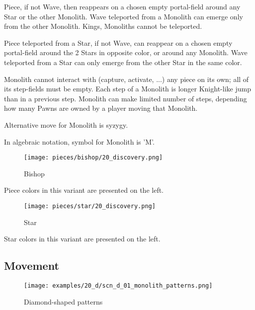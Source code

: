 Piece, if not Wave, then reappears on a chosen empty portal-field around
any Star or the other Monolith. Wave teleported from a Monolith can emerge
only from the other Monolith. Kings, Monoliths cannot be teleported.

Piece teleported from a Star, if not Wave, can reappear on a chosen empty
portal-field around the 2 Stars in opposite color, or around any Monolith.
Wave teleported from a Star can only emerge from the other Star in the same
color.

Monolith cannot interact with (capture, activate, ...) any piece on its own;
all of its step-fields must be empty. Each step of a Monolith is longer
Knight-like jump than in a previous step. Monolith can make limited number of
steps, depending how many Pawns are owned by a player moving that Monolith.

Alternative move for Monolith is syzygy.

In algebraic notation, symbol for Monolith is 'M'.

\clearpage %

\noindent
\begin{wrapfigure}[2]{l}{0.4\textwidth}
\centering
\texttt{[image: pieces/bishop/20\_discovery.png]}
\caption{Bishop}
\label{fig:bishop/20_discovery}
\end{wrapfigure}
Piece colors in this variant are presented on the left.

\vspace*{0.30\textheight}
\noindent
\begin{wrapfigure}[2]{l}{0.4\textwidth}
\centering
\texttt{[image: pieces/star/20\_discovery.png]}
\caption{Star}
\label{fig:star/20_discovery}
\end{wrapfigure}
Star colors in this variant are presented on the left.

\clearpage %

\subsection*{Movement}
\label{sec:Discovery/Monolith/Movement}

\vspace*{-1.4\baselineskip}
\noindent
\begin{figure}[!h]
\texttt{[image: examples/20\_d/scn\_d\_01\_monolith\_patterns.png]}
\vspace*{-1.3\baselineskip}
\caption{Diamond-shaped patterns}
\label{fig:scn_d_01_monolith_patterns}
\end{figure}

